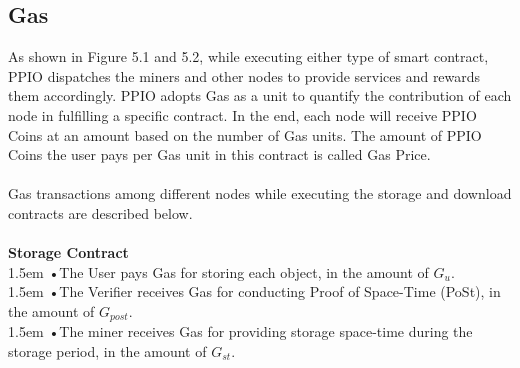 \documentclass[10pt,a4paper]{article}
\begin{document}
      \subsection{Gas}  %
As shown in Figure 5.1 and 5.2, while executing either type of smart contract, PPIO dispatches the miners and other nodes to provide services and rewards them accordingly. PPIO adopts Gas as a unit to quantify the contribution of each node in fulfilling a specific contract. In the end, each node will receive PPIO Coins at an amount based on the number of Gas units. The amount of PPIO Coins the user pays per Gas unit in this contract is called Gas Price.
 \vspace{-0.6em}
\\ \\Gas transactions among different nodes while executing the storage and download contracts are described below.
 \vspace{-0.5em}
\\\\{\bf Storage Contract} 
 \vspace{-0.8em}
\\

\hangindent 1.5em
\noindent   
•\quad The User pays Gas for storing each object, in the amount of $G_{u}$.
 \vspace{-0.6em}
\\

\hangindent 1.5em
\noindent   
•\quad The Verifier receives Gas for conducting Proof of Space-Time (PoSt), in the amount of $G_{post}$.
 \vspace{-0.6em}
\\

\hangindent 1.5em
\noindent   
•\quad The miner receives Gas for providing storage space-time during the storage period, in the amount of $G_{st}$.
 \vspace{-0.5em}
\\
\end{document}
